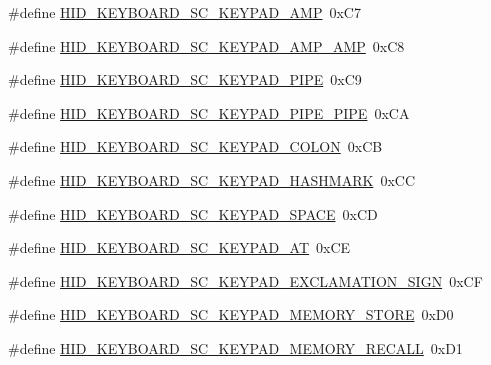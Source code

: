 \begin{DoxyCompactItemize}
\item 
\#define \hyperlink{group__Group__USBClassHIDCommon_ga893be5b8fa5197807317e3f211142755}{H\+I\+D\+\_\+\+K\+E\+Y\+B\+O\+A\+R\+D\+\_\+\+S\+C\+\_\+\+K\+E\+Y\+P\+A\+D\+\_\+\+A\+MP}~0x\+C7
\item 
\#define \hyperlink{group__Group__USBClassHIDCommon_gafc56ddabef991d21bd6f6cd8b4b21b36}{H\+I\+D\+\_\+\+K\+E\+Y\+B\+O\+A\+R\+D\+\_\+\+S\+C\+\_\+\+K\+E\+Y\+P\+A\+D\+\_\+\+A\+M\+P\+\_\+\+A\+MP}~0x\+C8
\item 
\#define \hyperlink{group__Group__USBClassHIDCommon_gad2325c22b4c8d923bdfb6b1f3e30618c}{H\+I\+D\+\_\+\+K\+E\+Y\+B\+O\+A\+R\+D\+\_\+\+S\+C\+\_\+\+K\+E\+Y\+P\+A\+D\+\_\+\+P\+I\+PE}~0x\+C9
\item 
\#define \hyperlink{group__Group__USBClassHIDCommon_gabfc613aefaada522b14c16c49b2132b5}{H\+I\+D\+\_\+\+K\+E\+Y\+B\+O\+A\+R\+D\+\_\+\+S\+C\+\_\+\+K\+E\+Y\+P\+A\+D\+\_\+\+P\+I\+P\+E\+\_\+\+P\+I\+PE}~0x\+CA
\item 
\#define \hyperlink{group__Group__USBClassHIDCommon_ga057c2b2981f6b14496a82a92928eb124}{H\+I\+D\+\_\+\+K\+E\+Y\+B\+O\+A\+R\+D\+\_\+\+S\+C\+\_\+\+K\+E\+Y\+P\+A\+D\+\_\+\+C\+O\+L\+ON}~0x\+CB
\item 
\#define \hyperlink{group__Group__USBClassHIDCommon_gac2db888a18014aa86c6bbc32be2110c2}{H\+I\+D\+\_\+\+K\+E\+Y\+B\+O\+A\+R\+D\+\_\+\+S\+C\+\_\+\+K\+E\+Y\+P\+A\+D\+\_\+\+H\+A\+S\+H\+M\+A\+RK}~0x\+CC
\item 
\#define \hyperlink{group__Group__USBClassHIDCommon_ga2f522c379666d0ce3b57c58f0c1d4fc8}{H\+I\+D\+\_\+\+K\+E\+Y\+B\+O\+A\+R\+D\+\_\+\+S\+C\+\_\+\+K\+E\+Y\+P\+A\+D\+\_\+\+S\+P\+A\+CE}~0x\+CD
\item 
\#define \hyperlink{group__Group__USBClassHIDCommon_gae40eddf5d91c2fb452465a536d0a57fe}{H\+I\+D\+\_\+\+K\+E\+Y\+B\+O\+A\+R\+D\+\_\+\+S\+C\+\_\+\+K\+E\+Y\+P\+A\+D\+\_\+\+AT}~0x\+CE
\item 
\#define \hyperlink{group__Group__USBClassHIDCommon_ga1fb22e48c1d94cd61f084a1eb02293a6}{H\+I\+D\+\_\+\+K\+E\+Y\+B\+O\+A\+R\+D\+\_\+\+S\+C\+\_\+\+K\+E\+Y\+P\+A\+D\+\_\+\+E\+X\+C\+L\+A\+M\+A\+T\+I\+O\+N\+\_\+\+S\+I\+GN}~0x\+CF
\item 
\#define \hyperlink{group__Group__USBClassHIDCommon_gae868d3172aaf6e8427ec0856fab6f8ea}{H\+I\+D\+\_\+\+K\+E\+Y\+B\+O\+A\+R\+D\+\_\+\+S\+C\+\_\+\+K\+E\+Y\+P\+A\+D\+\_\+\+M\+E\+M\+O\+R\+Y\+\_\+\+S\+T\+O\+RE}~0x\+D0
\item 
\#define \hyperlink{group__Group__USBClassHIDCommon_ga3587d53740922f8cd47a77a41469b535}{H\+I\+D\+\_\+\+K\+E\+Y\+B\+O\+A\+R\+D\+\_\+\+S\+C\+\_\+\+K\+E\+Y\+P\+A\+D\+\_\+\+M\+E\+M\+O\+R\+Y\+\_\+\+R\+E\+C\+A\+LL}~0x\+D1

\end{DoxyCompactItemize}
